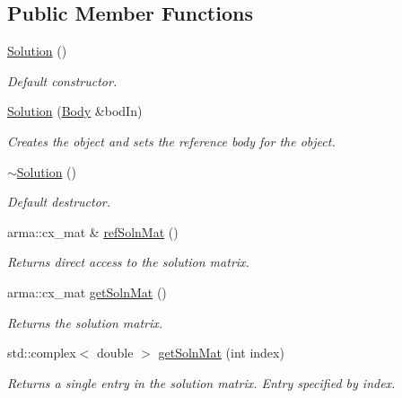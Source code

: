 \subsection*{Public Member Functions}
\begin{DoxyCompactItemize}
\item 
\hyperlink{classosea_1_1ofreq_1_1_solution_ab55bd4b023d596ce11aaf737b9a6123b}{Solution} ()
\begin{DoxyCompactList}\small\item\em Default constructor. \end{DoxyCompactList}\item 
\hyperlink{classosea_1_1ofreq_1_1_solution_a94b7a7a4ba3f9ce130be62f2ca3768a4}{Solution} (\hyperlink{classosea_1_1ofreq_1_1_body}{Body} \&bod\-In)
\begin{DoxyCompactList}\small\item\em Creates the object and sets the reference body for the object. \end{DoxyCompactList}\item 
\hyperlink{classosea_1_1ofreq_1_1_solution_a5d245f7409aacf6ace5e965b7879a580}{$\sim$\-Solution} ()
\begin{DoxyCompactList}\small\item\em Default destructor. \end{DoxyCompactList}\item 
arma\-::cx\-\_\-mat \& \hyperlink{classosea_1_1ofreq_1_1_solution_a97e6a64afec87dd0fa217f1d49449ac9}{ref\-Soln\-Mat} ()
\begin{DoxyCompactList}\small\item\em Returns direct access to the solution matrix. \end{DoxyCompactList}\item 
arma\-::cx\-\_\-mat \hyperlink{classosea_1_1ofreq_1_1_solution_a00801ca01862410a65fba3215bc8a789}{get\-Soln\-Mat} ()
\begin{DoxyCompactList}\small\item\em Returns the solution matrix. \end{DoxyCompactList}\item 
std\-::complex$<$ double $>$ \hyperlink{classosea_1_1ofreq_1_1_solution_a8f850820d65445470f4a0a5351f990e7}{get\-Soln\-Mat} (int index)
\begin{DoxyCompactList}\small\item\em Returns a single entry in the solution matrix. Entry specified by index. \end{DoxyCompactList}\item 

\end{DoxyCompactItemize}
